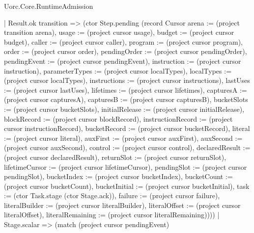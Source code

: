 \begin{lexlean}{Uorc.Core.RuntimeAdmission}
\begin{semanticmodule}
{        | Result.ok transition => (ctor Step.pending (record Cursor {arena := (project transition arena), usage := (project cursor usage), budget := (project cursor budget), caller := (project cursor caller), program := (project cursor program), order := (project cursor order), pendingOrder := (project cursor pendingOrder), pendingEvent := (project cursor pendingEvent), instruction := (project cursor instruction), parameterTypes := (project cursor localTypes), localTypes := (project cursor localTypes), instructions := (project cursor instructions), lastUses := (project cursor lastUses), lifetimes := (project cursor lifetimes), capturesA := (project cursor capturesA), capturesB := (project cursor capturesB), bucketSlots := (project cursor bucketSlots), initialRelease := (project cursor initialRelease), blockRecord := (project cursor blockRecord), instructionRecord := (project cursor instructionRecord), bucketRecord := (project cursor bucketRecord), literal := (project cursor literal), auxFirst := (project cursor auxFirst), auxSecond := (project cursor auxSecond), control := (project cursor control), declaredResult := (project cursor declaredResult), returnSlot := (project cursor returnSlot), lifetimeCursor := (project cursor lifetimeCursor), pendingSlot := (project cursor pendingSlot), bucketIndex := (project cursor bucketIndex), bucketCount := (project cursor bucketCount), bucketInitial := (project cursor bucketInitial), task := (ctor Task.stage (ctor Stage.ack)), failure := (project cursor failure), literalBuilder := (project cursor literalBuilder), literalOffset := (project cursor literalOffset), literalRemaining := (project cursor literalRemaining)})))
      | Stage.scalar => (match (project cursor pendingEvent)
}
\end{semanticmodule}
\end{lexlean}

